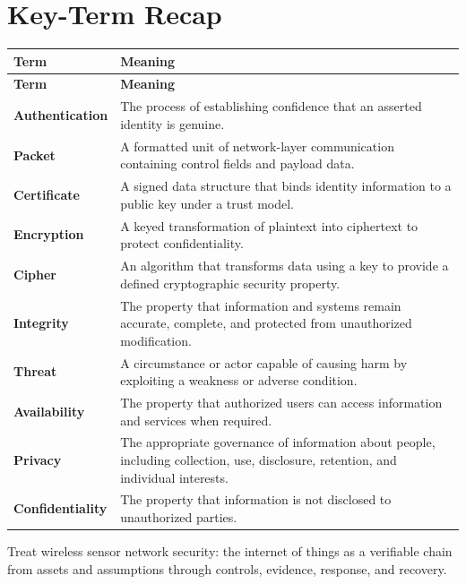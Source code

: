 \documentclass[11pt]{article}
\begin{document}
\section*{Key-Term Recap}
\begin{longtable}{>{\RaggedRight\arraybackslash}p{}>{\RaggedRight\arraybackslash}p{}}
\toprule\rowcolor{Navy}\color{white}\textbf{Term} & \color{white}\textbf{Meaning}\\\midrule
\endfirsthead
\toprule\rowcolor{Navy}\color{white}\textbf{Term} & \color{white}\textbf{Meaning}\\\midrule
\endhead
\textbf{Authentication} & The process of establishing confidence that an asserted identity is genuine. \\\midrule
\textbf{Packet} & A formatted unit of network-layer communication containing control fields and payload data. \\\midrule
\textbf{Certificate} & A signed data structure that binds identity information to a public key under a trust model. \\\midrule
\textbf{Encryption} & A keyed transformation of plaintext into ciphertext to protect confidentiality. \\\midrule
\textbf{Cipher} & An algorithm that transforms data using a key to provide a defined cryptographic security property. \\\midrule
\textbf{Integrity} & The property that information and systems remain accurate, complete, and protected from unauthorized modification. \\\midrule
\textbf{Threat} & A circumstance or actor capable of causing harm by exploiting a weakness or adverse condition. \\\midrule
\textbf{Availability} & The property that authorized users can access information and services when required. \\\midrule
\textbf{Privacy} & The appropriate governance of information about people, including collection, use, disclosure, retention, and individual interests. \\\midrule
\textbf{Confidentiality} & The property that information is not disclosed to unauthorized parties. \\\midrule
\bottomrule
\end{longtable}
\begin{takeawaybox}
Treat wireless sensor network security: the internet of things as a verifiable chain from assets and assumptions through controls, evidence, response, and recovery.
\end{takeawaybox}
\end{document}
